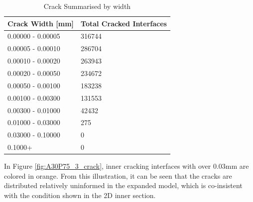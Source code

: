 \begin{table}[!h]
\centering
\begin{tabular}{ |p{4cm}|p{5cm}| }
\hline
 Crack Width [mm] &  Total Cracked Interfaces \\
 \hline\hline

   0.00000 - 0.00005 & 316744 \\
   0.00005 - 0.00010 & 286704 \\
   0.00010 - 0.00020 & 263943 \\
   0.00020 - 0.00050 & 234672 \\
   0.00050 - 0.00100 & 183238 \\
   0.00100 - 0.00300 & 131553 \\
   0.00300 - 0.01000 & 42432 \\
   0.01000 - 0.03000 & 275 \\
   0.03000 - 0.10000 & 0 \\
   0.1000+ & 0 \\

  \hline
  \end{tabular}
\caption{Crack Summarised by width}
\label{table:A30P75_3_Cracks}
\end{table}

In Figure \ref{fig:A30P75_3_crack}, inner cracking interfaces with over 0.03mm are colored in orange. From this illustration, it can be seen that the cracks are distributed relatively uninformed in the expanded model, which is co-insistent with the condition shown in the 2D inner section.
